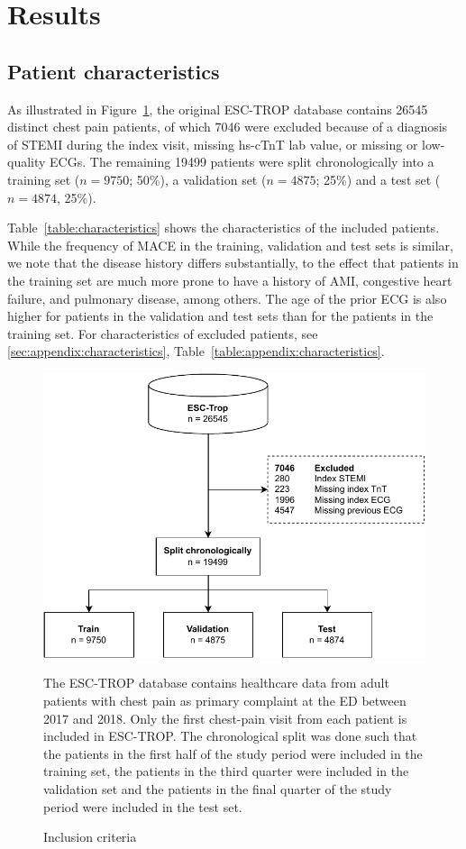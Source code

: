 \documentclass[preprint]{elsarticle}
\begin{document}
\section{Results}
\subsection{Patient characteristics}
\label{sec:patient_characteristics}
As illustrated in Figure~\ref{fig:inclusion}, the original ESC-TROP database contains 26545 distinct chest pain patients, of which 7046 were excluded because of a diagnosis of STEMI during the index visit, missing hs-cTnT lab value, or missing or low-quality ECGs. The remaining 19499 patients were split chronologically into a training set ($n=9750$; 50\%), a validation set ($n=4875$; 25\%) and a test set ($n=4874$, 25\%).

Table~\ref{table:characteristics} shows the characteristics of the included patients. While the frequency of MACE in the training, validation and test sets is similar, we note that the disease history differs substantially, to the effect that patients in the training set are much more prone to have a history of AMI, congestive heart failure, and pulmonary disease, among others. The age of the prior ECG is also higher for patients in the validation and test sets than for the patients in the training set. For characteristics of excluded patients, see \ref{sec:appendix:characteristics}, Table~\ref{table:appendix:characteristics}. 

\begin{figure}[h!]
\includegraphics[width=\linewidth]{inclusioncriteria-crop.pdf}
\centering
\caption{Inclusion criteria}
\medskip
\small
The ESC-TROP database contains healthcare data from adult patients with chest pain as primary complaint at the ED between 2017 and 2018. Only the first chest-pain visit from each patient is included in ESC-TROP. The chronological split was done such that the patients in the first half of the study period were included in the training set, the patients in the third quarter were included in the validation set and the patients in the final quarter of the study period were included in the test set. 
\label{fig:inclusion}
\end{figure}
\end{document}
